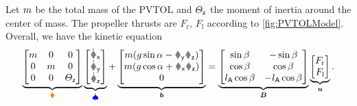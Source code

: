 Let $m$ be the total mass of the PVTOL and $\varTheta_{\mathsf{z}}$ the moment of inertia around the center of mass.
The propeller thrusts are $F_\text{r}$, $F_\text{l}$ according to \autoref{fig:PVTOLModel}.
Overall, we have the kinetic equation
\begin{align}
 \underbrace{\begin{bmatrix} \m & 0 & 0 \\ 0 & \m & 0 \\ 0 & 0 & \Jz \end{bmatrix}}_{\sysInertiaMat}
 \underbrace{\begin{bmatrix} \vxd \\ \vyd \\ \wzd \end{bmatrix}}_{\sysVeld}
 +
 \underbrace{\begin{bmatrix} m(\gravityAccConst \sin\tiltAngle - \vy \wz) \\ m (\gravityAccConst \cos\tiltAngle + \vx \wz) \\ 0 \end{bmatrix}}_{\sysForce}
 =
 \underbrace{\begin{bmatrix} \sin\beta & -\sin\beta \\ \cos\beta & \cos\beta \\ \ArmRadius \cos\beta & -\ArmRadius\cos\beta \end{bmatrix}}_{\sysInputMat}
 \underbrace{\begin{bmatrix} F_\text{r} \\ F_\text{l} \end{bmatrix}}_{\sysInput}
 .
\end{align}

